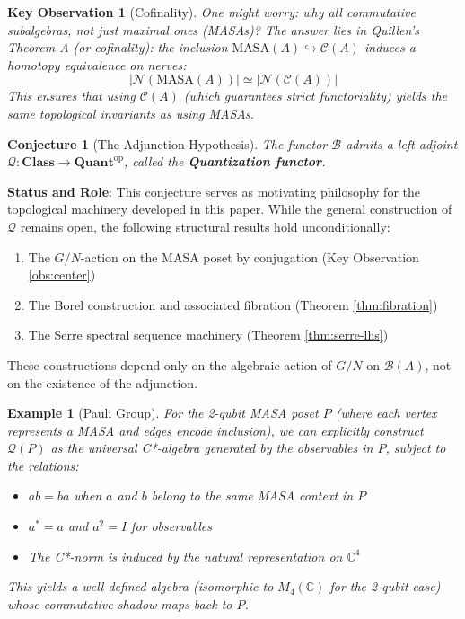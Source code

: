 \documentclass[11pt]{article}
\newtheorem{conjecture}[theorem]{Conjecture}
\newtheorem{keyobservation}[theorem]{Key Observation}
\newtheorem{example}[theorem]{Example}
\begin{document}
\begin{keyobservation}[Cofinality]\label{obs:cofinality}
One might worry: why all commutative subalgebras, not just maximal ones (MASAs)? The answer lies in Quillen's Theorem A (or cofinality): the inclusion $\text{MASA}(A) \hookrightarrow \mathcal{C}(A)$ induces a homotopy equivalence on nerves:
\[
|\mathcal{N}(\text{MASA}(A))| \simeq |\mathcal{N}(\mathcal{C}(A))|
\]
This ensures that using $\mathcal{C}(A)$ (which guarantees strict functoriality) yields the same topological invariants as using MASAs.
\end{keyobservation}

\begin{conjecture}[The Adjunction Hypothesis]\label{conj:adjunction}
The functor $\mathcal{B}$ admits a left adjoint $\mathcal{Q}: \mathbf{Class} \to \mathbf{Quant}^{\text{op}}$, called the \textbf{Quantization functor}.
\end{conjecture}

\textbf{Status and Role}: This conjecture serves as motivating philosophy for the topological machinery developed in this paper. While the general construction of $\mathcal{Q}$ remains open, the following structural results hold unconditionally:
\begin{enumerate}
\item The $G/N$-action on the MASA poset by conjugation (Key Observation \ref{obs:center})
\item The Borel construction and associated fibration (Theorem \ref{thm:fibration})
\item The Serre spectral sequence machinery (Theorem \ref{thm:serre-lhs})
\end{enumerate}

These constructions depend only on the algebraic action of $G/N$ on $\mathcal{B}(A)$, not on the existence of the adjunction.

\begin{example}[Pauli Group]\label{ex:pauli}
For the 2-qubit MASA poset $P$ (where each vertex represents a MASA and edges encode inclusion), we can explicitly construct $\mathcal{Q}(P)$ as the universal C*-algebra generated by the observables in $P$, subject to the relations:
\begin{itemize}
\item $ab = ba$ when $a$ and $b$ belong to the same MASA context in $P$
\item $a^* = a$ and $a^2 = I$ for observables
\item The C*-norm is induced by the natural representation on $\mathbb{C}^4$
\end{itemize}

This yields a well-defined algebra (isomorphic to $M_4(\mathbb{C})$ for the 2-qubit case) whose commutative shadow maps back to $P$.
\end{example}
\end{document}

